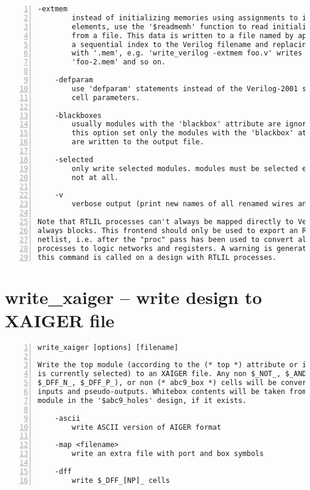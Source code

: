\begin{lstlisting}[numbers=left,frame=single]
    -extmem
        instead of initializing memories using assignments to individual
        elements, use the '$readmemh' function to read initialization data
        from a file. This data is written to a file named by appending
        a sequential index to the Verilog filename and replacing the extension
        with '.mem', e.g. 'write_verilog -extmem foo.v' writes 'foo-1.mem',
        'foo-2.mem' and so on.

    -defparam
        use 'defparam' statements instead of the Verilog-2001 syntax for
        cell parameters.

    -blackboxes
        usually modules with the 'blackbox' attribute are ignored. with
        this option set only the modules with the 'blackbox' attribute
        are written to the output file.

    -selected
        only write selected modules. modules must be selected entirely or
        not at all.

    -v
        verbose output (print new names of all renamed wires and cells)

Note that RTLIL processes can't always be mapped directly to Verilog
always blocks. This frontend should only be used to export an RTLIL
netlist, i.e. after the "proc" pass has been used to convert all
processes to logic networks and registers. A warning is generated when
this command is called on a design with RTLIL processes.
\end{lstlisting}

\section{write\_xaiger -- write design to XAIGER file}
\label{cmd:write_xaiger}
\begin{lstlisting}[numbers=left,frame=single]
    write_xaiger [options] [filename]

Write the top module (according to the (* top *) attribute or if only one module
is currently selected) to an XAIGER file. Any non $_NOT_, $_AND_, (optionally
$_DFF_N_, $_DFF_P_), or non (* abc9_box *) cells will be converted into psuedo-
inputs and pseudo-outputs. Whitebox contents will be taken from the equivalent
module in the '$abc9_holes' design, if it exists.

    -ascii
        write ASCII version of AIGER format

    -map <filename>
        write an extra file with port and box symbols

    -dff
        write $_DFF_[NP]_ cells
\end{lstlisting}

